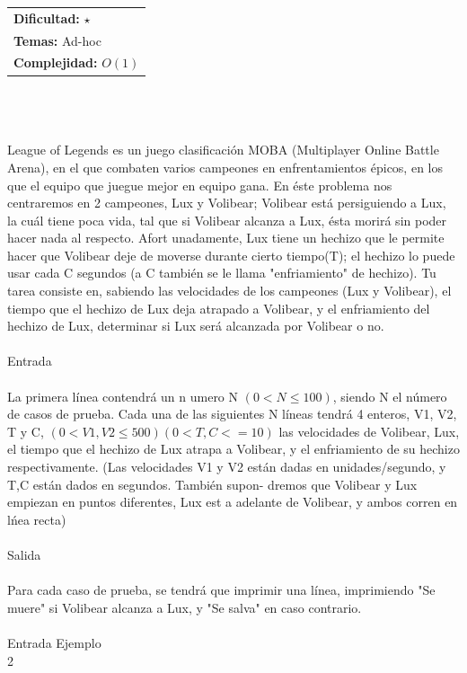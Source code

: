 \documentclass[12pt]{article}
\begin{document}
\hfill
\begin{tabular}{@{}l@{}}
\textbf{Dificultad:} $\star$ \\
\textbf{Temas:} Ad-hoc \\
\textbf{Complejidad:} $O(1)$
\end{tabular}\\
\\
\\League of Legends es un juego clasificaci\'on MOBA (Multiplayer Online Battle Arena), en el que combaten varios
campeones en enfrentamientos \'epicos, en los que el equipo que juegue mejor en equipo gana.
En \'este problema nos centraremos en 2 campeones, Lux y Volibear; Volibear est\'a persiguiendo a Lux, la cu\'al
tiene poca vida, tal que si Volibear alcanza a Lux, \'esta morir\'a sin poder hacer nada al respecto.
Afort
unadamente, Lux tiene un hechizo que le permite hacer que Volibear deje de moverse durante cierto
tiempo(T); el hechizo lo puede usar cada C segundos (a C tambi\'en se le llama "enfriamiento" de hechizo).
Tu tarea consiste en, sabiendo las velocidades de los campeones (Lux y Volibear), el tiempo que el hechizo de
Lux deja atrapado a Volibear, y el enfriamiento del hechizo de Lux, determinar si Lux ser\'a alcanzada por Volibear
o no.\\
\\
\textrm{\large Entrada}
\\
\\La primera l\'inea contendr\'a un n umero N $(0 < N \leq 100)$, siendo N el n\'umero de casos de prueba. Cada una
de las siguientes N l\'ineas tendr\'a 4 enteros, V1, V2, T y C, $(0 < V1,V2 \leq 500)  (0 < T,C <= 10)$ las velocidades de
Volibear, Lux, el tiempo que el hechizo de Lux atrapa a Volibear, y el enfriamiento de su hechizo respectivamente.
(Las velocidades V1 y V2 est\'an dadas en unidades/segundo, y T,C est\'an dados en segundos. Tambi\'en supon-
dremos que Volibear y Lux empiezan en puntos diferentes, Lux est a adelante de Volibear, y ambos corren en l\'nea
recta)\\
\\
\textrm{\large Salida}
\\
\\Para cada caso de prueba, se tendr\'a que imprimir una l\'inea, imprimiendo "Se muere" si Volibear alcanza a Lux,
y "Se salva" en caso contrario.
\\
\\
\textrm{\large Entrada Ejemplo}
\\
2\\
\end{document}
